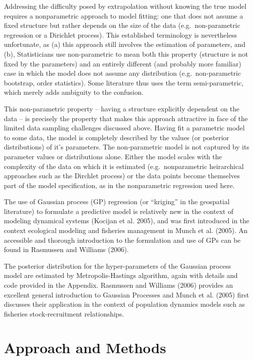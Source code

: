\documentclass[author-year, review]{elsarticle} %
\begin{document}
Addressing the difficulty posed by extrapolation without knowing the
true model requires a nonparametric approach to model fitting: one that
does not assume a fixed structure but rather depends on the size of the
data (e.g.~non-parametric regression or a Dirichlet process). This
established terminology is nevertheless unfortunate, as (a) this
approach still involves the estimation of parameters, and (b),
Statisticians use non-parametric to mean both this property (structure
is not fixed by the parameters) and an entirely different (and probably
more familiar) case in which the model does not assume any distribution
(e.g.~non-parametric bootstrap, order statistics). Some literature thus
uses the term semi-parametric, which merely adds ambiguity to the
confusion.

This non-parametric property -- having a structure explicitly dependent
on the data -- is precisely the property that makes this approach
attractive in face of the limited data sampling challenges discussed
above. Having fit a parametric model to some data, the model is
completely described by the values (or posterior distributions) of it's
parameters. The non-parametric model is not captured by its parameter
values or distributions alone. Either the model scales with the
complexity of the data on which it is estimated (e.g.~nonparametric
heirarchical approaches such as the Dirchlet process) or the data points
become themselves part of the model specification, as in the
nonparametric regression used here.

The use of Gaussian process (GP) regression (or ``kriging'' in the
geospatial literature) to formulate a predictive model is relatively new
in the context of modeling dynamical systems (Kocijan et al. 2005), and
was first introduced in the context ecological modeling and fisheries
management in Munch et al. (2005). An accessible and thorough
introduction to the formulation and use of GPs can be found in Rasmussen
and Williams (2006).

The posterior distribution for the hyper-parameters of the Gaussian
process model are estimated by Metropolis-Hastings algorithm, again with
details and code provided in the Appendix. Rasmussen and Williams (2006)
provides an excellent general introduction to Gaussian Processes and
Munch et al. (2005) first discusses their application in the context of
population dynamics models such as fisheries stock-recruitment
relationships.

\section{Approach and Methods}\label{approach-and-methods}
\end{document}
